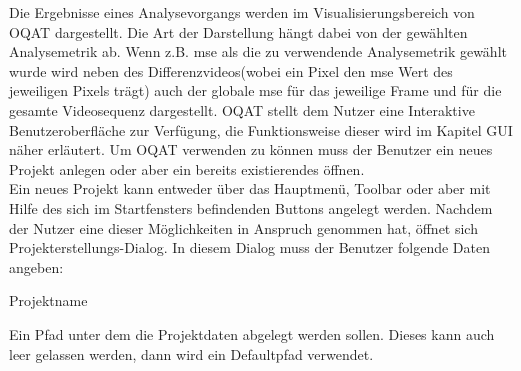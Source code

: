  Die Ergebnisse eines Analysevorgangs werden im Visualisierungsbereich von \gls{OQAT} dargestellt.
Die Art der Darstellung hängt dabei von der gewählten Analysemetrik ab. Wenn z.B. \gls{mse} als die
zu verwendende Analysemetrik gewählt wurde wird neben des Differenzvideos(wobei ein Pixel den \gls{mse}
Wert des jeweiligen Pixels trägt) auch der globale \gls{mse} für das jeweilige Frame und für die gesamte
Videosequenz dargestellt.
 \gls{OQAT} stellt dem Nutzer eine Interaktive Benutzeroberfläche zur Verfügung, die
Funktionsweise dieser wird im Kapitel GUI näher erläutert.
 Um \gls{OQAT} verwenden zu können muss der Benutzer ein neues Projekt anlegen oder aber
ein bereits existierendes öffnen. \\
Ein neues Projekt kann entweder über das Hauptmenü, Toolbar oder aber mit Hilfe des sich
im Startfensters befindenden Buttons angelegt werden. Nachdem der Nutzer eine dieser Möglichkeiten
in Anspruch genommen hat, öffnet sich Projekterstellungs-Dialog. In diesem Dialog
muss der Benutzer folgende Daten angeben:
\begin{compactitem}
\item Projektname
\item Ein Pfad unter dem die Projektdaten abgelegt werden sollen. Dieses kann auch leer gelassen werden, 
dann wird ein Defaultpfad verwendet.
\end{compactitem}

